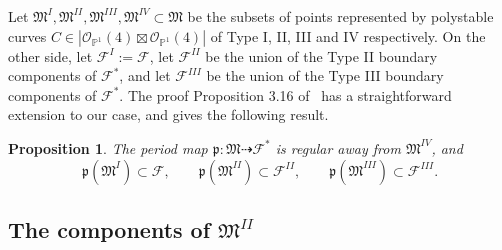 \documentclass[11pt]{amsart}
\numberwithin{equation}{section}
\theoremstyle{plain}
\newtheorem{proposition}[theorem]{Proposition}
\theoremstyle{remark}
\theoremstyle{definition}
\newcommand{\sF}{\mathscr{F}}
\newcommand{\gp}{\mathfrak{p}}
\newcommand{\cO}{{\mathscr O}}
\newcommand{\dra}{\dashrightarrow}
\newcommand{\gM}{\mathfrak{M}}
\newcommand{\PP}{{\mathbb P}}
\begin{document}
 
Let $\gM^I,\gM^{II},\gM^{III},\gM^{IV}\subset\gM$ be the subsets of points represented by polystable curves $C\in|\cO_{\PP^1}(4)\boxtimes\cO_{\PP^1}(4)|$   of Type I,   II, III  and  IV  respectively. On the other side, let $\sF^I:=\sF$, let  $\sF^{II}$ be the union of the Type II boundary components of $\sF^{*}$, and let $\sF^{III}$ be the union of the Type III boundary components of 
$\sF^{*}$. The proof Proposition 3.16 of~\cite{log2} has a straightforward extension   to our case, and gives the following result.
%
 \begin{proposition}\label{prp:est3}
 The  period map $\gp\colon\gM\dra\sF^{*}$  is regular away from $\gM^{IV}$, and 
%
\begin{equation*}
%
\gp(\gM^I)\subset\sF,\qquad \gp(\gM^{II})\subset\sF^{II},\qquad  \gp(\gM^{III})\subset\sF^{III}.
%
\end{equation*}
%
%
 \end{proposition}
%
%
\subsection{The  components of $\gM^{II}$}%
\end{document}
